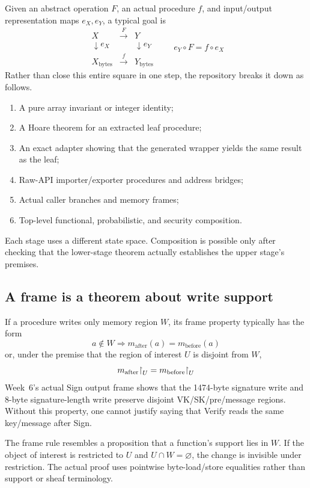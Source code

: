 Given an abstract operation \(F\), an actual procedure \(f\), and input/output
representation maps \(e_X,e_Y\), a typical goal is
\[
\begin{array}{ccc}
X & \xrightarrow{F} & Y\\
\downarrow e_X & & \downarrow e_Y\\
X_{\mathrm{bytes}} & \xrightarrow{f} & Y_{\mathrm{bytes}}
\end{array}
\qquad
e_Y\circ F=f\circ e_X
\]
Rather than close this entire square in one step, the repository breaks it down
as follows.

\begin{enumerate}
  \item A pure array invariant or integer identity;
  \item A Hoare theorem for an extracted leaf procedure;
  \item An exact adapter showing that the generated wrapper yields the same result as the leaf;
  \item Raw-API importer/exporter procedures and address bridges;
  \item Actual caller branches and memory frames;
  \item Top-level functional, probabilistic, and security composition.
\end{enumerate}

Each stage uses a different state space. Composition is possible only after
checking that the lower-stage theorem actually establishes the upper stage's
premises.

\subsection{A frame is a theorem about write support}

If a procedure writes only memory region \(W\), its frame property typically
has the form
\[
  a\notin W\Longrightarrow m_{\mathrm{after}}(a)=m_{\mathrm{before}}(a)
\]
or, under the premise that the region of interest \(U\) is disjoint from \(W\),
\[
  m_{\mathrm{after}}\mathord{\upharpoonright}_U=m_{\mathrm{before}}\mathord{\upharpoonright}_U
\]
Week~6's actual Sign output frame shows that the 1474-byte signature write and
8-byte signature-length write preserve disjoint VK/SK/pre/message regions.
Without this property, one cannot justify saying that Verify reads the same
key/message after Sign.

\begin{analogy}
The frame rule resembles a proposition that a function's support lies in \(W\).
If the object of interest is restricted to \(U\) and \(U\cap W=\varnothing\),
the change is invisible under restriction. The actual proof uses pointwise
byte-load/store equalities rather than support or sheaf terminology.
\end{analogy}

